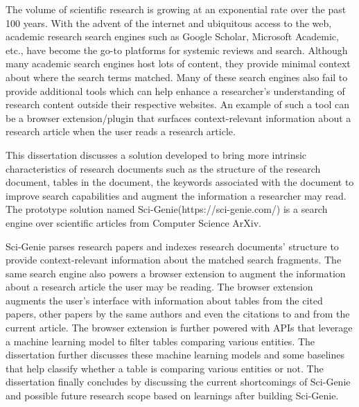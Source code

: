 The volume of scientific research is growing at an exponential rate over the past 100 years. 
With the advent of the internet and ubiquitous access to the web, academic research search engines such as Google Scholar, Microsoft Academic, etc., have become the go-to platforms for systemic reviews and search.  Although many academic search engines host lots of content, they provide minimal context about where the search terms matched. 
Many of these search engines also fail to provide additional tools which can help enhance a researcher's understanding of research content outside their respective websites.
An example of such a tool can be a browser extension/plugin that surfaces context-relevant information about a research article when the user reads a research article.   

This dissertation discusses a solution developed to bring more intrinsic characteristics of research documents such as the structure of the research document, tables in the document,  the keywords associated with the document to improve search capabilities and augment the information a researcher may read.  The prototype solution named Sci-Genie(https://sci-genie.com/) is a search engine over scientific articles from Computer Science ArXiv.

Sci-Genie parses research papers and indexes research documents’ structure to provide context-relevant information about the matched search fragments. The same search engine also powers a browser extension to augment the information about a research article the user may be reading. The browser extension augments the user's interface with information about tables from the cited papers, other papers by the same authors and even the citations to and from the current article. The browser extension is further powered with APIs that leverage a machine learning model to filter tables comparing various entities. 
The dissertation further discusses these machine learning models and some baselines that help classify whether a table is comparing various entities or not.  
The dissertation finally concludes by discussing the current shortcomings of Sci-Genie and possible future research scope based on learnings after building Sci-Genie.
